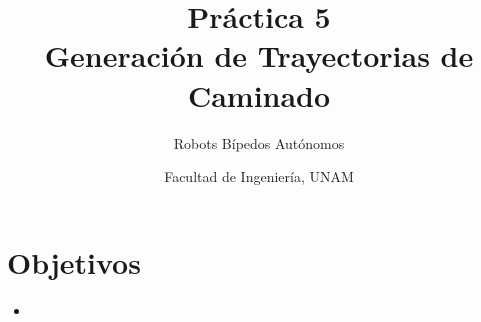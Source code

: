 \documentclass[letterpaper,12pt]{article}
\title{Práctica 5 \\ Generación de Trayectorias de Caminado}
\author{Robots Bípedos Autónomos}
\date{Facultad de Ingeniería, UNAM}
\begin{document}
\renewcommand{\tablename}{Tabla}
\maketitle
\section*{Objetivos}
\begin{itemize}
\item 
\end{itemize}
\end{document}
